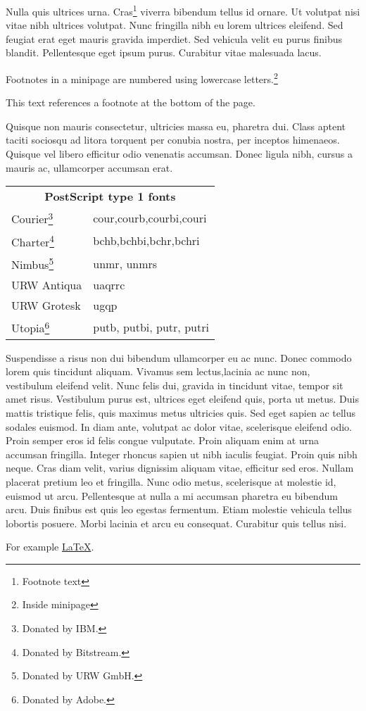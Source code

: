 \documentclass{article}
\def\query#1#2{\underline{#1}\marginpar{#2}}
\begin{document}
Nulla quis ultrices urna. Cras\footnote{Footnote text} viverra bibendum tellus id ornare.
Ut volutpat nisi vitae nibh ultrices volutpat. Nunc fringilla nibh eu
lorem ultrices eleifend. Sed feugiat erat eget mauris gravida imperdiet.
Sed vehicula velit eu purus finibus blandit. Pellentesque eget ipsum
purus. Curabitur vitae malesuada lacus.

\begin{minipage}{5cm}
Footnotes in a minipage are numbered
using lowercase letters.\footnote{%
Inside minipage} \par This text
references a footnote at the bottom
of the page.\footnotemark
\end{minipage}

Quisque non mauris consectetur, ultricies massa eu, pharetra dui.
Class aptent taciti sociosqu ad litora torquent per conubia nostra,
per inceptos himenaeos. Quisque vel libero efficitur odio venenatis
accumsan. Donec ligula nibh, cursus a mauris ac, ullamcorper accumsan erat.

\begin{minipage}{.5\linewidth}
\renewcommand{\thefootnote}{\thempfootnote}
\begin{tabular}{ll}
\multicolumn{2}{c}{\bfseries PostScript type 1 fonts} \\
Courier\footnote{Donated by IBM.} & cour,courb,courbi,couri \\
Charter\footnote{Donated by Bitstream.} & bchb,bchbi,bchr,bchri\\
Nimbus\footnote{Donated by URW GmbH.} & unmr, unmrs \\
URW Antiqua\footnotemark[\value{mpfootnote}] & uaqrrc\\
URW Grotesk\footnotemark[\value{mpfootnote}] & ugqp\\
Utopia\footnote{Donated by Adobe.} & putb, putbi, putr, putri
\end{tabular}
\end{minipage}

Suspendisse a risus non dui bibendum
ullamcorper eu ac nunc. Donec commodo lorem quis tincidunt aliquam.
Vivamus sem lectus,lacinia ac nunc non, vestibulum eleifend velit. Nunc felis dui,
gravida in tincidunt vitae, tempor sit amet risus. Vestibulum purus
est, ultrices eget eleifend quis, porta ut metus.
Duis mattis tristique felis, quis maximus metus ultricies quis. Sed eget sapien ac tellus
sodales euismod. In diam ante, volutpat ac dolor vitae, scelerisque eleifend odio. Proin
semper eros id felis \marginpar{\rule[-10.5mm]{1mm}{10mm}} congue vulputate. Proin
aliquam enim at urna accumsan fringilla. Integer rhoncus sapien ut nibh iaculis
feugiat. Proin quis nibh neque. Cras diam velit, varius dignissim aliquam vitae,
efficitur sed eros. Nullam placerat pretium leo et fringilla. Nunc odio metus,
scelerisque at molestie id, euismod ut arcu. Pellentesque at nulla a mi accumsan
pharetra eu bibendum arcu. Duis finibus est quis leo egestas fermentum. Etiam
molestie vehicula tellus lobortis posuere. Morbi lacinia et arcu eu consequat.
Curabitur quis tellus nisi.

For example \query{\LaTeX}{Hey!\\ Look}{}.
\end{document}
